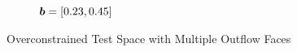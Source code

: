 \begin{frame}
\begin{figure}[!h]
\begin{subfigure}{0.485\textwidth}
        \caption{$\mathit{\bm{{b}}} = [0.23,0.45]$}
    \end{subfigure}
\caption{Overconstrained Test Space with Multiple Outflow Faces}
\end{figure}

\end{frame}